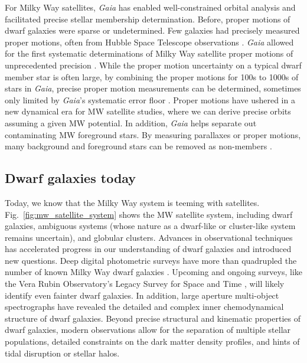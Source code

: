 For Milky Way satellites, \emph{Gaia} has enabled well-constrained
orbital analysis and facilitated precise stellar membership
determination. Before, proper motions of dwarf galaxies were sparse or
undetermined. Few galaxies had precisely measured proper motions, often
from Hubble Space Telescope observations \citep[e.g.,][]{sohn+2017}.
\emph{Gaia} allowed for the first systematic determinations of Milky Way
satellite proper motions of unprecedented precision
\citep{MV2020a, pace+li2019}. While the proper motion uncertainty on a
typical dwarf member star is often large, by combining the proper
motions for 100s to 1000s of stars in \emph{Gaia}, precise proper motion
measurements can be determined, sometimes only limited by \emph{Gaia}'s
systematic error floor \citep[e.g.,][]{MV2020a}. Proper motions have
ushered in a new dynamical era for MW satellite studies, where we can
derive precise orbits assuming a given MW potential. In addition,
\emph{Gaia} helps separate out contaminating MW foreground stars. By
measuring parallaxes or proper motions, many background and foreground
stars can be removed as non-members
\citep[e.g.,][\citet{jensen+2024}]{battaglia+2022}.

\subsection{Dwarf galaxies today}\label{dwarf-galaxies-today}

Today, we know that the Milky Way system is teeming with satellites.
Fig.~\ref{fig:mw_satellite_system} shows the MW satellite system,
including dwarf galaxies, ambiguous systems (whose nature as a
dwarf-like or cluster-like system remains uncertain), and globular
clusters. Advances in observational techniques has accelerated progress
in our understanding of dwarf galaxies and introduced new questions.
Deep digital photometric surveys have more than quadrupled the number of
known Milky Way dwarf galaxies \citep{simon2019}. Upcoming and ongoing
surveys, like the Vera Rubin Observatory's Legacy Survey for Space and
Time \citep{ivezic+2019}, will likely identify even fainter dwarf
galaxies. In addition, large aperture multi-object spectrographs have
revealed the detailed and complex inner chemodynamical structure of
dwarf galaxies. Beyond precise structural and kinematic properties of
dwarf galaxies, modern observations allow for the separation of multiple
stellar populations, detailed constraints on the dark matter density
profiles, and hints of tidal disruption or stellar halos.

